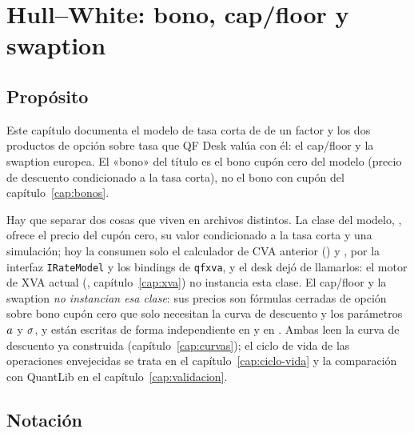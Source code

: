 \chapter{Hull--White: bono, cap/floor y swaption}\label{cap:hull-white}

\section{Propósito}\label{sec:cap05-proposito}

Este capítulo documenta el modelo de tasa corta de \citet{hull1990} de un factor y los dos productos de
opción sobre tasa que QF Desk valúa con él: el cap/floor y la swaption europea. El «bono» del título es el
bono cupón cero del modelo (precio de descuento condicionado a la tasa corta), no el bono con cupón del
capítulo~\ref{cap:bonos}.

Hay que separar dos cosas que viven en archivos distintos. La clase del modelo,
, ofrece el precio del cupón cero, su valor condicionado a
la tasa corta y una simulación; hoy la consumen solo el calculador de CVA anterior
() y ,
por la interfaz \texttt{IRateModel} y los bindings de \texttt{qfxva}, y el desk dejó de llamarlos: el motor de XVA actual
(, capítulo~\ref{cap:xva}) no instancia esta clase. El cap/floor y la
swaption \emph{no instancian esa clase}: sus precios son fórmulas cerradas de opción sobre bono cupón cero
que solo necesitan la curva de descuento y los parámetros $a$ y $\sigma$, y están escritas de forma
independiente en  y en
. Ambas leen la curva de descuento ya construida
(capítulo~\ref{cap:curvas}); el ciclo de vida de las operaciones envejecidas se trata en el
capítulo~\ref{cap:ciclo-vida} y la comparación con QuantLib en el capítulo~\ref{cap:validacion}.

\section{Notación}\label{sec:cap05-notacion}


